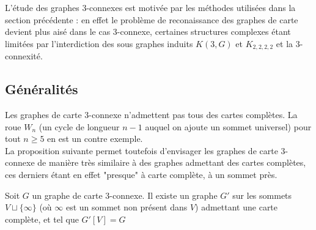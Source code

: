 \documentclass{scrartcl}
\begin{document}
\begin{flushleft}
L'étude des graphes $3$-connexes est motivée par les méthodes utilisées dans la section précédente : en effet le problème de
reconaissance des graphes de carte devient plus aisé dans le cas $3$-connexe, certaines structures complexes étant limitées
par l'interdiction des sous graphes induits $K(3, G)$ et $K_{2,2,2,2}$ et la $3$-connexité.

\subsection{Généralités}

Les graphes de carte $3$-connexe n'admettent pas tous des cartes complètes. La roue $W_n$ (un cycle de longueur $n-1$ auquel on ajoute un sommet universel)
pour tout $n \geq 5$ en est un contre exemple.\\
La proposition suivante permet toutefois d'envisager les graphes de carte $3$-connexe de manière très similaire à des graphes admettant
des cartes complètes, ces derniers étant en effet "presque" à carte complète, à un sommet près.

\begin{prop}\label{3connCompl}
    Soit $G$ un graphe de carte $3$-connexe. Il existe un graphe $G'$ sur les sommets $V \sqcup \{\infty\}$ (où $\infty$ est un sommet non
    présent dans $V$) admettant une carte complète, et tel que $G'[V] = G$
\end{prop}


\end{flushleft}
\end{document}
